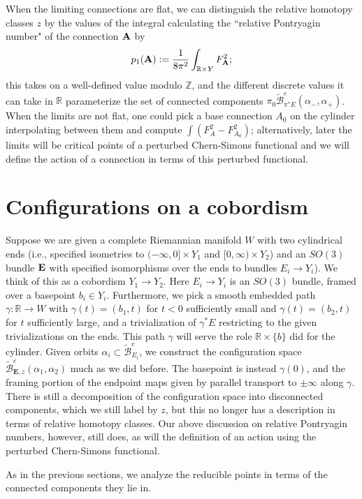 \documentclass{memo-l}
\newcommand{\pE}{\pi^* \! E}
\theoremstyle{definition}
\theoremstyle{remark}
\numberwithin{section}{chapter}
\numberwithin{equation}{chapter}
\begin{document}
When the limiting connections are flat, we can distinguish the relative homotopy classes $z$ by the values of the integral calculating the ``relative Pontryagin number" of the connection $\bf{A}$ by $$p_1(\mathbf{A}) := \frac{1}{8\pi^2} \int_{\mathbb R \times Y} F_{\bf A}^2;$$ this takes on a well-defined value modulo $\mathbb Z$, and the different discrete values it can take in $\mathbb R$ parameterize the set of connected components $\pi_0\widetilde{\mathcal B}^e_{\pE}(\alpha_-, \alpha_+)$. When the limits are not flat, one could pick a base connection $A_0$ on the cylinder interpolating between them and compute $\int (F_A^2 - F_{A_0}^2)$; alternatively, later the limits will be critical points of a perturbed Chern-Simons functional and we will define the action of a connection in terms of this perturbed functional.

\section{Configurations on a cobordism}\label{sec:config-4d}
Suppose we are given a complete Riemannian manifold $W$ with two cylindrical ends (i.e., specified isometries to $(-\infty, 0] \times Y_1$ and $[0, \infty) \times Y_2$) and an $SO(3)$ bundle $\bf E$ with specified isomorphisms over the ends to bundles $E_i \to Y_i$). We think of this as a cobordism $Y_1 \to Y_2$. Here $E_i \to Y_i$ is an $SO(3)$ bundle, framed over a basepoint $b_i \in Y_i$. Furthermore, we pick a smooth embedded path $\gamma: \mathbb R \to W$ with $\gamma(t) = (b_1, t)$ for $t < 0$ sufficiently small and $\gamma(t) = (b_2, t)$ for $t$ sufficiently large, and a trivialization of $\gamma^*E$ restricting to the given trivializations on the ends. This path $\gamma$ will serve the role $\mathbb R \times \{b\}$ did for the cylinder. Given orbits $\alpha_i \subset \widetilde{\mathcal B}^e_{E_i}$, we construct the configuration space $\widetilde{\mathcal B}^e_{\mathbf{E}, z}(\alpha_1, \alpha_2)$ much as we did before. The basepoint is instead $\gamma(0)$, and the framing portion of the endpoint maps given by parallel transport to $\pm \infty$ along $\gamma$. There is still a decomposition of the configuration space into disconnected components, which we still label by $z$, but this no longer has a description in terms of relative homotopy classes. Our above discussion on relative Pontryagin numbers, however, still does, as will the definition of an action using the perturbed Chern-Simons functional.

As in the previous sections, we analyze the reducible points in terms of the connected components they lie in. 
\end{document}
